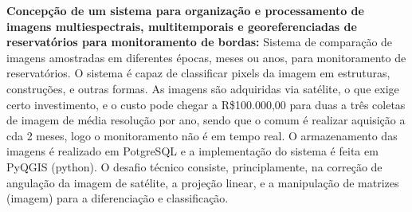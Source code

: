 \textbf{Concepção de um sistema para organização e processamento de imagens
multiespectrais, multitemporais e georeferenciadas de reservatórios para
monitoramento de bordas:}
Sistema de comparação de imagens amostradas em diferentes épocas, meses ou anos,
para monitoramento de reservatórios. O sistema é capaz de classificar pixels da
imagem em estruturas, construções, e outras formas. As imagens são adquiridas
via satélite, o que exige certo investimento, e o custo pode chegar a
R\$100.000,00 para duas a três coletas de imagem de média resolução por ano,
sendo que o comum é realizar aquisição a cda 2 meses, logo o monitoramento não é
em tempo real. O armazenamento das imagens é realizado em PotgreSQL e a
implementação do sistema é feita em PyQGIS (python). O desafio técnico consiste,
principlamente, na correção de angulação da imagem de satélite, a projeção
linear, e a manipulação de matrizes (imagem) para a diferenciação e
classificação.
